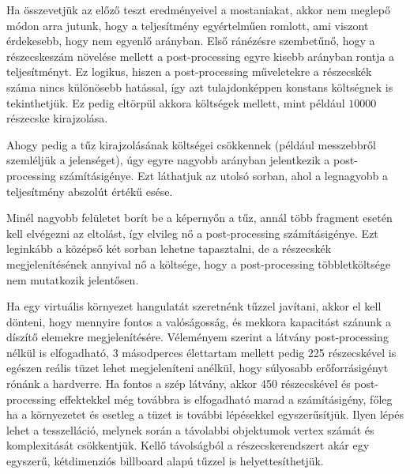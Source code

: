 Ha összevetjük az előző teszt eredményeivel a mostaniakat, akkor nem meglepő módon arra jutunk, hogy a teljesítmény egyértelműen romlott, ami viszont érdekesebb, hogy nem egyenlő arányban. Első ránézésre szembetűnő, hogy a részecskeszám növelése mellett a post-processing egyre kisebb arányban rontja a teljesítményt. Ez logikus, hiszen a post-processing műveletekre a részecskék száma nincs különösebb hatással, így azt tulajdonképpen konstans költségnek is tekinthetjük. Ez pedig eltörpül akkora költségek mellett, mint például $10000$ részecske kirajzolása.

Ahogy pedig a tűz kirajzolásának költségei csökkennek (például messzebbről szemléljük a jelenséget), úgy egyre nagyobb arányban jelentkezik a post-processing számításigénye. Ezt láthatjuk az utolsó sorban, ahol a legnagyobb a teljesítmény abszolút értékű esése.

Minél nagyobb felületet borít be a képernyőn a tűz, annál több fragment esetén kell elvégezni az eltolást, így elvileg nő a post-processing számításigénye. Ezt leginkább a középső két sorban lehetne tapasztalni, de a részecskék megjelenítésének annyival nő a költsége, hogy a post-processing többletköltsége nem mutatkozik jelentősen.

Ha egy virtuális környezet hangulatát szeretnénk tűzzel javítani, akkor el kell dönteni, hogy mennyire fontos a valóságosság, és mekkora kapacitást szánunk a díszítő elemekre megjelenítésére. Véleményem szerint a látvány post-processing nélkül is elfogadható, 3 másodperces élettartam mellett pedig 225 részecskével is egészen reális tüzet lehet megjeleníteni anélkül, hogy súlyosabb erőforrásigényt rónánk a hardverre. Ha fontos a szép látvány, akkor 450 részecskével és post-processing effektekkel még továbbra is elfogadható marad a számításigény, főleg ha a környezetet és esetleg a tüzet is további lépésekkel egyszerűsítjük. Ilyen lépés lehet a tesszelláció, melynek során a távolabbi objektumok vertex számát és komplexitását csökkentjük. Kellő távolságból a részecskerendszert akár egy egyszerű, kétdimenziós billboard alapú tűzzel is helyettesíthetjük.








